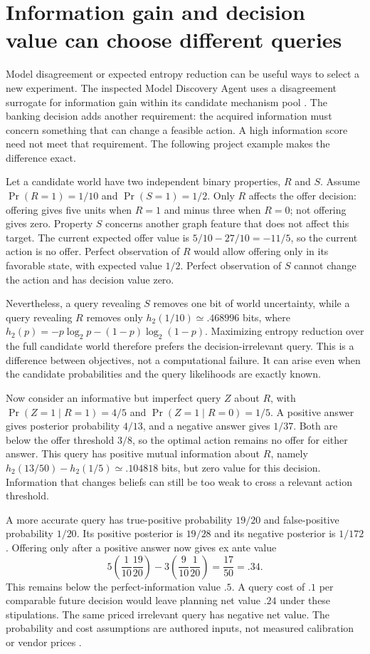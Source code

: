 \section{Information gain and decision value can choose different queries}
\label{exec14:l4-information-objective}

Model disagreement or expected entropy reduction can be useful ways to select
a new experiment. The inspected Model Discovery Agent uses a disagreement
surrogate for information gain within its candidate mechanism pool
\citep{v12_la_2608_09696}. The banking decision adds another requirement:
the acquired information must concern something that can change a feasible
action. A high information score need not meet that requirement. The following
project example makes the difference exact.

Let a candidate world have two independent binary properties, $R$ and $S$.
Assume $\Pr(R=1)=1/10$ and $\Pr(S=1)=1/2$. Only $R$ affects the offer
decision: offering gives five units when $R=1$ and minus three when $R=0$;
not offering gives zero. Property $S$ concerns another graph feature that
does not affect this target. The current expected offer value is
$5/10-27/10=-11/5$, so the current action is no offer. Perfect observation
of $R$ would allow offering only in its favorable state, with expected value
$1/2$. Perfect observation of $S$ cannot change the action and has decision
value zero.

Nevertheless, a query revealing $S$ removes one bit of world uncertainty,
while a query revealing $R$ removes only
$h_2(1/10)\simeq .468996$ bits, where
$h_2(p)=-p\log_2p-(1-p)\log_2(1-p)$. Maximizing entropy reduction over
the full candidate world therefore prefers the decision-irrelevant query.
This is a difference between objectives, not a computational failure. It can
arise even when the candidate probabilities and the query likelihoods are
exactly known.

Now consider an informative but imperfect query $Z$ about $R$, with
$\Pr(Z=1\mid R=1)=4/5$ and $\Pr(Z=1\mid R=0)=1/5$. A positive answer
gives posterior probability $4/13$, and a negative answer gives $1/37$.
Both are below the offer threshold $3/8$, so the optimal action remains no
offer for either answer. This query has positive mutual information about
$R$, namely $h_2(13/50)-h_2(1/5)\simeq .104818$ bits, but zero value
for this decision. Information that changes beliefs can still be too weak to
cross a relevant action threshold.

A more accurate query has true-positive probability $19/20$ and
false-positive probability $1/20$. Its positive posterior is $19/28$ and
its negative posterior is $1/172$. Offering only after a positive answer
now gives ex ante value
\[
 5\left(\frac1{10}\frac{19}{20}\right)
 -3\left(\frac9{10}\frac1{20}\right)
 =\frac{17}{50}=.34.
\]
This remains below the perfect-information value $.5$. A query cost of $.1$
per comparable future decision would leave planning net value $.24$ under
these stipulations. The same priced irrelevant query has negative net value.
The probability and cost assumptions are authored inputs, not measured
calibration or vendor prices \citep{exec14_discovery_screening_value}.

